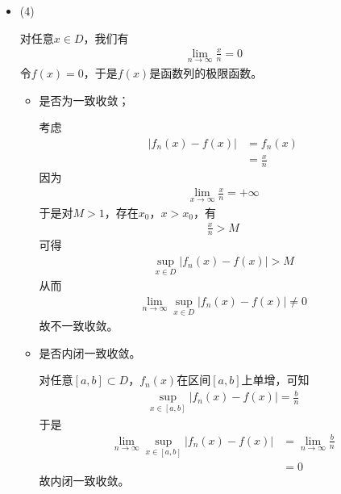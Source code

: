 \documentclass{article}
\begin{document}
\begin{itemize}
  \item (4)

        对任意$x \in D$，我们有
        \begin{align*}
          \lim\limits_{n \to \infty} \frac{x}{n} = 0
        \end{align*}
        令$f(x) = 0$，于是$f(x)$是函数列的极限函数。

        \begin{itemize}
          \item 是否为一致收敛；

                考虑
                \begin{align*}
                  |f_n(x) - f(x)|
                   & = f_n(x)      \\
                   & = \frac{x}{n}
                \end{align*}
                因为
                \begin{align*}
                  \lim\limits_{x \to \infty} \frac{x}{n} = +\infty
                \end{align*}
                于是对$M > 1$，存在$x_0$，$x > x_0$，有
                \begin{align*}
                  \frac{x}{n} > M
                \end{align*}
                可得
                \begin{align*}
                  \sup \limits_{x \in D} |f_n(x) - f(x)| > M
                \end{align*}
                从而
                \begin{align*}
                  \lim\limits_{n \to \infty} \sup\limits_{x \in D} |f_n(x) - f(x)| \neq 0
                \end{align*}
                故不一致收敛。

          \item 是否内闭一致收敛。

                对任意$[a, b] \subset D$，$f_n(x)$在区间$[a, b]$上单增，可知
                \begin{align*}
                  \sup\limits_{x \in [a, b]} |f_n(x) - f(x)| = \frac{b}{n}
                \end{align*}
                于是
                \begin{align*}
                  \lim\limits_{n \to \infty} \sup\limits_{x \in [a, b]} |f_n(x) - f(x)|
                   & = \lim\limits_{n \to \infty} \frac{b}{n} \\
                   & = 0
                \end{align*}
                故内闭一致收敛。
        \end{itemize}


\end{itemize}
\end{document}
